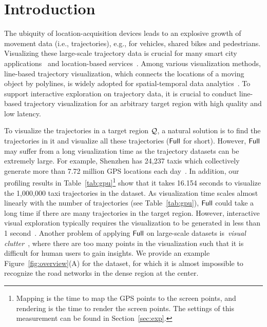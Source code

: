 \section{Introduction}\label{sec:intro}
The ubiquity of location-acquisition devices leads to an explosive growth of movement data (i.e., trajectories), e.g., for vehicles, shared bikes and pedestrians. Visualizing these large-scale trajectory data is crucial for many smart city applications~\cite{wang2014visual, tang2017efficient, zheng2011learning} and location-based services~\cite{liu2016smartadp, zheng2010collaborative}. Among various visualization methods, line-based trajectory visualization, which connects the locations of a moving object by polylines, is widely adopted for spatial-temporal data analytics~\cite{chen2015survey, visualanalysis, bigchanvis}. To support interactive exploration on trajectory data, it is crucial to conduct  line-based trajectory visualization for an arbitrary target region with high quality and low latency.


 To visualize the trajectories in a target region $\mathcal{Q}$, a natural solution is to find the trajectories in it and visualize all these trajectories ($\mathsf{Full}$ for short). However, $\mathsf{Full}$ may suffer from a long visualization time as the trajectory datasets can be extremely large. For example, Shenzhen has 24,237 taxis which collectively generate more than 7.72 million GPS locations each day~\cite{sz}. In addition, our profiling results in Table~\ref{tab:gpu}\footnote{Mapping is the time to map the GPS points to the screen points, and rendering is the time to render the screen points. The settings of this measurement can be found in Section~\ref{sec:exp}.} show that it takes 16.154 seconds to visualize the 1,000,000 taxi trajectories in the \pt{} dataset. As visualization time scales almost linearly with the number of trajectories (see Table~\ref{tab:gpu}), $\mathsf{Full}$ could take a long time if there are many trajectories in the target region. However, interactive visual exploration typically requires the visualization to be generated in less than 1 second~\cite{shneiderman1984response}. Another problem of applying $\mathsf{Full}$ on large-scale datasets is~\textit{visual clutter}~\cite{kwon2017sampling}, where there are too many points in the visualization such that it is difficult for human users to gain insights. We provide an example Figure~\ref{fig:overview}(A) for the \pt{} dataset, for which it is almost impossible to recognize the road networks in the dense region at the center.

